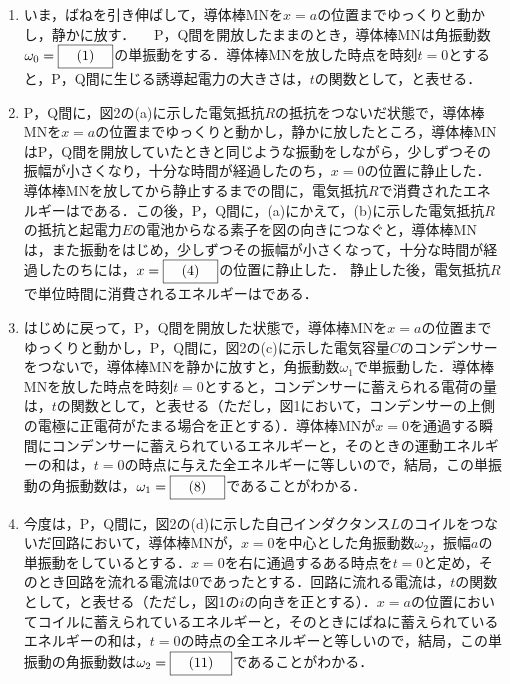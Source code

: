 \begin{enumerate}[I]  
  \item いま，ばねを引き伸ばして，導体棒MNを$x = a$の位置までゆっくりと動かし，静かに放す．
    　P，Q間を開放したままのとき，導体棒MNは角振動数$\omega _0 = \text{\boxnum{1}}$の単振動をする．導体棒MNを放した時点を時刻$t = 0$とすると，P，Q間に生じる誘導起電力の大きさは，$t$の関数として，と表せる．　
  \item P，Q間に，図2の(a)に示した電気抵抗$R$の抵抗をつないだ状態で，導体棒MNを$x = a$の位置までゆっくりと動かし，静かに放したところ，導体棒MNはP，Q間を開放していたときと同じような振動をしながら，少しずつその振幅が小さくなり，十分な時間が経過したのち，$x = 0$の位置に静止した．導体棒MNを放してから静止するまでの間に，電気抵抗$R$で消費されたエネルギーはである．この後，P，Q間に，(a)にかえて，(b)に示した電気抵抗$R$の抵抗と起電力$E$の電池からなる素子を図の向きにつなぐと，導体棒MNは，また振動をはじめ，少しずつその振幅が小さくなって，十分な時間が経過したのちには，$x = \text{\boxnum{4}}$の位置に静止した．
    静止した後，電気抵抗$R$で単位時間に消費されるエネルギーはである．　
  \item はじめに戻って，P，Q間を開放した状態で，導体棒MNを$x = a$の位置までゆっくりと動かし，P，Q間に，図2の(c)に示した電気容量$C$のコンデンサーをつないで，導体棒MNを静かに放すと，角振動数$\omega_1$で単振動した．導体棒MNを放した時点を時刻$t = 0$とすると，コンデンサーに蓄えられる電荷の量は，$t$の関数として，と表せる（ただし，図1において，コンデンサーの上側の電極に正電荷がたまる場合を正とする）．導体棒MNが$x = 0$を通過する瞬間にコンデンサーに蓄えられているエネルギーと，そのときの運動エネルギーの和は，$t = 0$の時点に与えた全エネルギーに等しいので，結局，この単振動の角振動数は，$\omega_1 = \text{\boxnum{8}}$であることがわかる．
  \item 今度は，P，Q間に，図2の(d)に示した自己インダクタンス$L$のコイルをつないだ回路において，導体棒MNが，$x = 0$を中心とした角振動数$\omega_2$，振幅$a$の単振動をしているとする．$x= 0$を右に通過するある時点を$t = 0$と定め，そのとき回路を流れる電流は$0$であったとする．回路に流れる電流は，$t$の関数として，と表せる（ただし，図1の$i$の向きを正とする）．$x = a$の位置においてコイルに蓄えられているエネルギーと，そのときにばねに蓄えられているエネルギーの和は，$t = 0$の時点の全エネルギーと等しいので，結局，この単振動の角振動数は$\omega_2 = \text{\boxnum{11}}$であることがわかる．

\end{enumerate}



